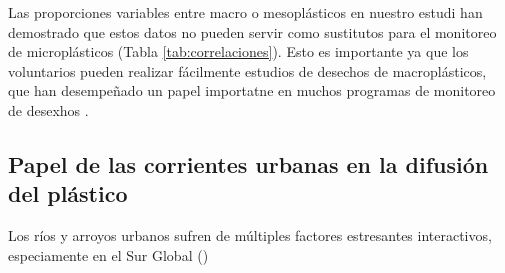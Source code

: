 Las proporciones variables entre macro o mesoplásticos en nuestro estudi han demostrado que estos datos no pueden servir como sustitutos para el monitoreo de microplásticos (Tabla \ref{tab:correlaciones}). Esto es importante ya que los voluntarios pueden realizar fácilmente estudios de desechos de macroplásticos, que han desempeñado un papel importatne en muchos programas de monitoreo de desexhos \parencite{RIBIC2012994}.

\subsection{Papel de las corrientes urbanas en la difusión del plástico}

Los ríos y arroyos urbanos sufren de múltiples factores estresantes interactivos, especiamente en el Sur Global ()

